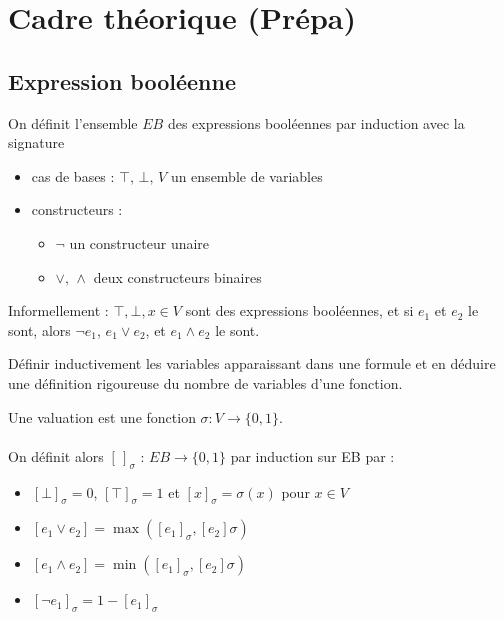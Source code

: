 
\section{Cadre théorique (Prépa)}

\subsection{Expression booléenne}

\begin{definition}
	On définit l'ensemble $EB$ des expressions booléennes par induction avec la signature
	\begin{itemize}[label=$\bullet$]
		\item cas de bases : $\top, \,\bot, \,V$ un ensemble de variables
		\item constructeurs :\begin{itemize}[label=$\star$]
			\item $\neg$ un constructeur unaire
			\item $\vee, \, \wedge$ deux constructeurs binaires
		\end{itemize}
	\end{itemize}
\end{definition}

Informellement : $\top, \bot, x \in V$ sont des expressions booléennes, et si $e_1$ et $e_2$ le sont, alors $\neg e_1$, $e_1\vee e_2$, et $e_1 \wedge e_2$ le sont.

\begin{exercise}
	Définir inductivement les variables apparaissant dans une formule et en déduire une définition rigoureuse du nombre de variables d'une fonction.
\end{exercise}

\begin{definition}
	Une valuation est une fonction $\sigma :V \to \{0,1\}$.
	\\
	\\
	On définit alors $[\,]_\sigma$ : $EB \to \{0, 1\}$ par induction sur EB par :\begin{itemize}[label=$\bullet$]
		\item $[\bot]_\sigma = 0$, $[\top]_\sigma = 1$ et $[x]_\sigma = \sigma(x)$ pour $x \in V$
		\item $[e_1 \vee e_2] = \max([e_1]_\sigma, [e_2]\sigma)$
		\item $[e_1 \wedge e_2] = \min([e_1]_\sigma, [e_2]\sigma)$
		\item $[\neg e_1]_\sigma = 1-[e_1]_\sigma$
	\end{itemize}
\end{definition}

